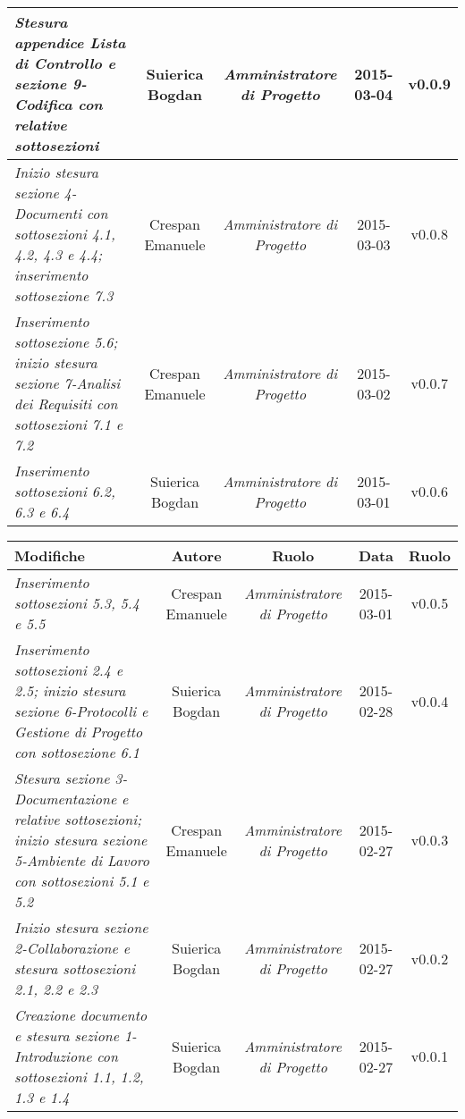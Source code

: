 \begin{table}[h]
\begin{tabular}{|p{}|c|c|c|c|}
    \midrule
	    \textit{Stesura appendice Lista di Controllo e sezione 9-Codifica con relative sottosezioni} & Suierica Bogdan & \textit{Amministratore di Progetto} & 2015-03-04 & v0.0.9 \\
	\midrule
		\textit{Inizio stesura sezione 4-Documenti con sottosezioni 4.1, 4.2, 4.3 e 4.4; inserimento sottosezione 7.3} & Crespan Emanuele & \textit{Amministratore di Progetto} & 2015-03-03 & v0.0.8 \\
	\midrule
		 \textit{Inserimento sottosezione 5.6; inizio stesura sezione 7-Analisi dei Requisiti con sottosezioni 7.1 e 7.2} & Crespan Emanuele & \textit{Amministratore di Progetto} & 2015-03-02 & v0.0.7 \\
	\midrule
		\textit{Inserimento sottosezioni 6.2, 6.3 e 6.4} & Suierica Bogdan & \textit{Amministratore di Progetto} & 2015-03-01 & v0.0.6 \\
	\bottomrule
\end{tabular}	
\end{table}
\newpage
\begin{table}
\centering
\begin{tabular}{|p{}|c|c|c|c|}
	\toprule
	\textbf{Modifiche} & \textbf{Autore} & \textbf{Ruolo} & \textbf{Data} & \textbf{Ruolo} \\
	\midrule
	\midrule
		\textit{Inserimento sottosezioni 5.3, 5.4 e 5.5} & Crespan Emanuele & \textit{Amministratore di Progetto} & 2015-03-01 & v0.0.5 \\
	\midrule
		\textit{Inserimento sottosezioni 2.4 e 2.5; inizio stesura sezione 6-Protocolli e Gestione di Progetto con sottosezione 6.1} & Suierica Bogdan & \textit{Amministratore di Progetto} & 2015-02-28 & v0.0.4 \\
	\midrule
		\textit{Stesura sezione 3-Documentazione e relative sottosezioni; inizio stesura sezione 5-Ambiente di Lavoro con sottosezioni 5.1 e 5.2} & Crespan Emanuele & \textit{Amministratore di Progetto} & 2015-02-27 & v0.0.3 \\ 
	\midrule
		\textit{Inizio stesura sezione 2-Collaborazione e stesura sottosezioni 2.1, 2.2 e 2.3} & Suierica Bogdan & \textit{Amministratore di Progetto} & 2015-02-27 & v0.0.2 \\	                         
	\midrule
		\textit{Creazione documento e stesura sezione 1-Introduzione con sottosezioni 1.1, 1.2, 1.3 e 1.4} & Suierica Bogdan & \textit{Amministratore di Progetto} & 2015-02-27 & v0.0.1 \\
	\bottomrule
\end{tabular}	
\end{table}

\newpage